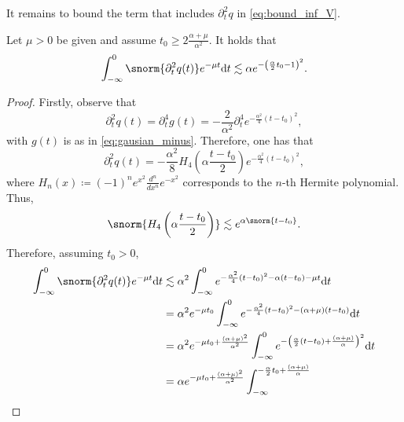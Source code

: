 It remains to bound the term that includes $\partial_t^2q$ in \eqref{eq:bound_inf_V}.

\begin{lemma}\label{lmm:Smallness_Rickert_wavelet}
Let $\mu>0$ be given and assume
$t_0\geq 2 \frac{\alpha+ \mu}{\alpha^2}$.
It holds that
\begin{equation}
	\int_{-\infty}^{0}
	\snorm{\partial^2_t  q (t)}
	e^{-\mu t}
	\normalfont\text{d} t
	\lesssim
	\alpha
	e^{
        -
        \left(
            \frac{\alpha}{2} t_0
            -
            1
        \right)^2
	}.
\end{equation}
\end{lemma}

\begin{proof}
Firstly, observe that
\begin{equation}
	{\partial^2_t  q (t)}
	=
	{\partial^4_t  g (t)}
	=
	-\frac{2}{\alpha^2}
	\partial^4_t  e^{- \frac{\alpha^2}{4} (t-t_0)^2},
\end{equation}
with $g(t)$ is as in \eqref{eq:gausian_minus}. Therefore, one has that
\begin{equation}
	{\partial^2_t  q (t)}
	=
	-\frac{\alpha^2}{8}
	H_4\left(\alpha\frac{t-t_0}{2}\right)
	e^{- \frac{\alpha^2}{4} (t-t_0)^2},
\end{equation}	
where $H_n(x) \coloneqq (-1)^n e^{x^2} \frac{d^n}{dx^n} e^{-x^2}$ corresponds to the $n$-th Hermite polynomial. Thus, 
\begin{equation}
	\snorm{
		H_4\left(\alpha\frac{t-t_0}{2}\right)
	}
	\lesssim
	e^{\alpha\snorm{t-t_0}}.
\end{equation}
Therefore, assuming $t_0>0$,
\begin{equation}
\begin{aligned}
	\int_{-\infty}^{0}
	\snorm{\partial^2_t  q (t)}
	e^{-\mu t}
	\normalfont\text{d} t
	&
	\lesssim
	\alpha^2
	\int_{-\infty}^{0}
	e^{- \frac{\alpha^2}{4} (t-t_0)^2-\alpha(t-t_0) -\mu t}
	\normalfont\text{d} t
	\\
	&
	=
	\alpha^2 e^{- \mu t_0 }
	\int_{-\infty}^{0}
	e^{- \frac{\alpha^2}{4} (t-t_0)^2-(\alpha+\mu)(t-t_0)}
	\normalfont\text{d} t
	\\
	&
	=
	\alpha^2 
	e^{
		- \mu t_0 
		+
		\frac{(\alpha+\mu)^2}{\alpha^2}
	}
	\int_{-\infty}^{0}
	e^{- \left(\frac{\alpha}{2} (t-t_0)+\frac{(\alpha+\mu)}{\alpha}\right)^2}
	\normalfont\text{d} t
	\\
	&
	=
	\alpha
	e^{
		-\mu t_0 
		+
		\frac{(\alpha+\mu)^2}{\alpha^2}
	}
	\int_{-\infty}^{-\frac{\alpha}{2} t_0+\frac{(\alpha+\mu)}{\alpha}}

\end{aligned}
\end{equation}
\end{proof}
